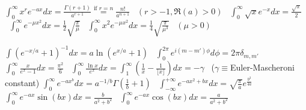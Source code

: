 {$\int_0^\infty\!x^re^{-ax}dx{=}\frac{\Gamma(r{+}1)}{a^{r+1}}\stackrel{\text{if }r{=}n}{=}\frac{n!}{a^{n+1}}$ \ {\scriptsize$(r{>}{-}1,\Re(a){>}0)$} \
$\int_0^\infty\!\sqrt{x}e^{-x}dx{=}\frac{\sqrt{\pi}}{2}$ \
$\int_0^\infty\!e^{-\mu x^2}dx{=}\frac{1}{2}\sqrt{\frac{\pi}{\mu}}$ \
$\int_0^\infty\!x^2e^{-\mu x^2}dx{=}\frac{1}{4}\sqrt{\frac{\pi}{\mu^3}}$ \ {\scriptsize$(\mu{>}0)$}

$\int\!(e^{-x/a}{+}1)^{-1}dx{=}a\ln(e^{x/a}{+}1)$ \
$\int_0^{2\pi}\!e^{i(m-m')\phi}d\phi{=}2\pi\delta_{m,m'}$ \
$\int_0^\infty\!\frac{x}{e^x{-}1}dx{=}\frac{\pi^2}{6}$ \
$\int_0^\infty\!\frac{\ln x}{e^x}dx{=}\int_1^\infty\!\left(\frac{1}{x}{-}\frac{1}{\lfloor x\rfloor}\right)dx{=}{-}\gamma$ \ ($\gamma{\equiv}$Euler-Mascheroni constant)
$\int_0^\infty\!e^{-ax^b}dx{=}a^{-1/b}\Gamma\left(\frac{1}{b}{+}1\right)$ \ $\int_{-\infty}^{+\infty}\!e^{-ax^2{+}bx}dx{=}\sqrt{\frac{\pi}{a}}e^{\frac{b^2}{4a}}$\\
$\int_0^\infty\!e^{-ax}\sin(bx)dx{=}\frac{b}{a^2{+}b^2}$ \
$\int_0^\infty\!e^{-ax}\cos(bx)dx{=}\frac{a}{a^2{+}b^2}$ 
}
